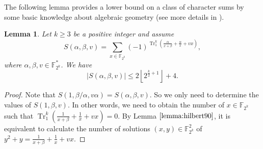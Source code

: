 \documentclass{article}
\newcommand{\F}{\mathbb{F}}
\newcommand{\0}{\textbf{0}}
\newcommand{\1}{\textbf{1}}
\newcommand{\TRACE}{\operatorname{Tr}_1^k}
\theoremstyle{plain}
\newtheorem{lemma}{Lemma}
\begin{document}
The following lemma provides a lower bound on a class of character sums by some basic knowledge about algebraic geometry (see more details in \cite{Stichtenoth2008book_algebraicfunctionfieldsandcodes}).
    \begin{lemma}\label{lemma:charactersums}
        Let $k\ge 3$ be a positive integer and assume
        \[S(\alpha,\beta,v)=\sum_{x\in\F_{2^k}}(-1)^{\TRACE\left( \frac{\alpha}{x+\beta}+\frac{\alpha}{x}+vx \right)},\]
        where $\alpha,\beta,v\in\F_{2^k}^*$.
        We have
        \[\left\lvert S(\alpha,\beta,v)\right\rvert\le 2\left\lfloor 2^{\frac{k}{2}+1}\right\rfloor+4 .\]
    \end{lemma}
    \begin{proof}
        Note that $S(1,\beta/\alpha,v\alpha)=S(\alpha,\beta,v)$.
        So we only need to determine the values of $S(1,\beta,v)$.
        In other words, we need to obtain the number of $x\in\F_{2^k}$ such that $\TRACE\left( \frac{1}{x+\beta}+\frac{1}{x}+vx \right)=0$.
        By Lemma $\ref{lemma:hilbert90}$, it is equivalent to calculate the number of solutions $(x,y)\in\F_{2^k}^2$ of $y^2+y=\frac{1}{x+\beta}+\frac{1}{x}+vx$.


\end{proof}
\end{document}
